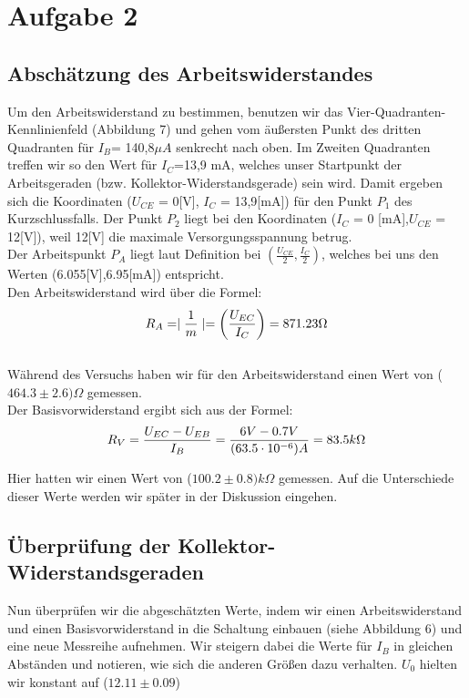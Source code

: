 \section{Aufgabe 2}
\subsection{Abschätzung des Arbeitswiderstandes}

Um den Arbeitswiderstand zu bestimmen, benutzen wir das Vier-Quadranten-Kennlinienfeld (Abbildung 7) und gehen vom äußersten Punkt des dritten Quadranten für \(I_B\)= 140,8\(\mu A\) senkrecht nach oben. Im Zweiten Quadranten treffen wir so den Wert für \(I_C\)=13,9 mA, welches unser Startpunkt der Arbeitsgeraden (bzw. Kollektor-Widerstandsgerade) sein wird. Damit ergeben sich die Koordinaten (\(U_{CE}\) = 0[V], \(I_{C}\) = 13,9[mA]) für den Punkt \(P_1\) des Kurzschlussfalls. Der Punkt \(P_2\) liegt bei den Koordinaten (\(I_{C}\) = 0 [mA],\(U_{CE}\) = 12[V]), weil 12[V] die maximale Versorgungsspannung betrug.\\
Der Arbeitspunkt \(P_{A}\) liegt laut Definition bei \(\left(\frac{U_{CE}}{2}, \frac{I_{C}}{2}\right)\), welches bei uns den Werten (6.055[V],6.95[mA]) entspricht.\\

Den Arbeitswiderstand wird über die Formel:
\begin{equation}
\notag
R_{A}=\mid \frac{1}{m}\mid = \left(\frac{U_{EC}}{I_C}\right) = 871.23 \Omega
\end{equation}\\

Während des Versuchs haben wir für den Arbeitswiderstand einen Wert von (\(464.3\pm 2.6)\Omega\) gemessen.\\

Der Basisvorwiderstand ergibt sich aus der Formel:
\begin{equation}
\notag
R_V= \frac{U_{EC}-U_{EB}}{I_B}=\frac{6V-0.7V}{(63.5\cdot 10^{-6})A}=83.5k\Omega
\end{equation}

Hier hatten wir einen Wert von (\(100.2\pm 0.8)k\Omega\) gemessen. Auf die Unterschiede dieser Werte werden wir später in der Diskussion eingehen.

\subsection{Überprüfung der Kollektor-Widerstandsgeraden}

Nun überprüfen wir die abgeschätzten Werte, indem wir einen Arbeitswiderstand und einen Basisvorwiderstand in die Schaltung einbauen (siehe Abbildung 6) und eine neue Messreihe aufnehmen. Wir steigern dabei die Werte für \(I_B\) in gleichen Abständen und notieren, wie sich die anderen Größen dazu verhalten. \(U_0\) hielten wir konstant auf (\(12.11\pm 0.09\))

